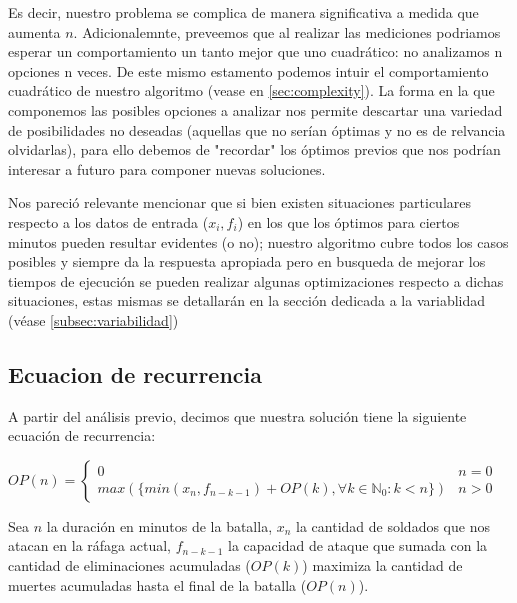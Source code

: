 Es decir, nuestro problema se complica de manera significativa a medida que aumenta $n$. Adicionalemnte, preveemos que al realizar las mediciones podriamos esperar un comportamiento un tanto mejor que uno cuadrático: no analizamos n opciones n veces. De este mismo estamento podemos intuir el comportamiento cuadrático de nuestro algoritmo (vease en \ref{sec:complexity}). La forma en la que componemos las posibles opciones a analizar nos permite descartar una variedad de posibilidades no deseadas (aquellas que no serían óptimas y no es de relvancia olvidarlas), para ello debemos de "recordar" los óptimos previos que nos podrían interesar a futuro para componer nuevas soluciones.

Nos pareció relevante mencionar que si bien existen situaciones particulares respecto a los datos de entrada ($x_i,f_i$) en los que los óptimos para ciertos minutos pueden resultar evidentes (o no); nuestro algoritmo cubre todos los casos posibles y siempre da la respuesta apropiada pero en busqueda de mejorar los tiempos de ejecución se pueden realizar algunas optimizaciones respecto a dichas situaciones, estas mismas se detallarán en la sección dedicada a la variablidad (véase \ref{subsec:variabilidad})

\subsection{Ecuacion de recurrencia} A partir del análisis previo, decimos que nuestra solución tiene la siguiente ecuación de recurrencia:
\begin{center}
    $OP(n)= \left\{ \begin{array}{lcc}
         0& n=0  \\
         max(\{min(x_n,f_{n-k-1})+OP(k),\forall k \in \mathbb{N}_0: k<n \}) &n>0 
    \end{array} \right. $  
\end{center}
Sea $n$ la duración en minutos de la batalla, $x_n$ la cantidad de soldados que nos atacan en la ráfaga actual, $f_{n-k-1}$ la capacidad de ataque que sumada con la cantidad de eliminaciones acumuladas ($OP(k)$) maximiza la cantidad de muertes acumuladas hasta el final de la batalla ($OP(n)$).

